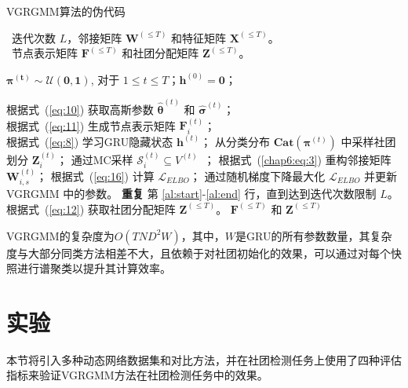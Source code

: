 \begin{algorithm}
	\caption{VGRGMM算法的伪代码} %
	\algorithmicrequire ~迭代次数 $L$，邻接矩阵 $\mathbf{W}^{(\le T)}$ 和特征矩阵 $\mathbf{X}^{(\le T)}$。\\
	\algorithmicensure ~节点表示矩阵 $\mathbf{F}^{(\le T)}$ 和社团分配矩阵 $\mathbf{Z}^{(\le T)}$。 \\
	\begin{algorithmic}[1]
		 $\bm{\pi^{(t)}} \sim \bm{\mathcal{U}(0,1)}$, 对于 $1 \le t \le T$；$ \mathbf{h}^{(0)}=\mathbf{0}$；
		 \label{al:start}
		
		\STATE 根据式~(\ref{eq:10}) 获取高斯参数 $\hat{\mathbf{\theta}}^{(t)}$ 和 $\hat{\mathbf{\sigma}}^{(t)}$； \label{al:enstart} \\
		\STATE 根据式~(\ref{eq:11}) 生成节点表示矩阵 $\mathbf{F}_i^{(t)}$； \label{al:enend} \\
		\STATE 根据式~(\ref{eq:8}) 学习GRU隐藏状态 $\mathbf{h}^{(t)}$； \label{al:ev}
		   \label{al:destart}
		\STATE 从分类分布 $\boldsymbol{Cat}(\bm{\pi}^{(t)})$ 中采样社团划分 $\mathbf{Z}_i^{(t)}$；
		\STATE 通过MC采样 $\mathcal{S}_i^{(t)} \subseteq V^{(t)}$~\cite{kingma2013auto}；
		\STATE 根据式~(\ref{chap6:eq:3}) 重构邻接矩阵 $\mathbf{W}_{i,s}^{(t)}$；
		\ENDFOR
		\ENDFOR 
		\ENDFOR \label{al:deend}
		\STATE 根据式~(\ref{eq:16}) 计算 $\mathcal{L}_{ELBO}$； \label{al:trstart}
		\STATE 通过随机梯度下降最大化 $\mathcal{L}_{ELBO}$ 并更新 VGRGMM 中的参数。\label{al:end} \label{al:trend}
		\STATE \textbf{重复} 第 \ref{al:start}-\ref{al:end} 行，直到达到迭代次数限制 $L$。
		\STATE 根据式~(\ref{eq:12}) 获取社团分配矩阵 $\mathbf{Z}^{(\le T)}$。 \label{al:ass}
		\RETURN $\mathbf{F}^{(\le T)}$ 和 $\mathbf{Z}^{(\le T)}$
		
	\end{algorithmic}
	\label{algorithm:chap6}
\end{algorithm}

VGRGMM的复杂度为$O(TND^2W)$，其中，$W$是GRU的所有参数数量，其复杂度与大部分同类方法相差不大，且依赖于对社团初始化的效果，可以通过对每个快照进行谱聚类以提升其计算效率。

\section{实验\label{chap6:experiment}}

本节将引入多种动态网络数据集和对比方法，并在社团检测任务上使用了四种评估指标来验证VGRGMM方法在社团检测任务中的效果。


